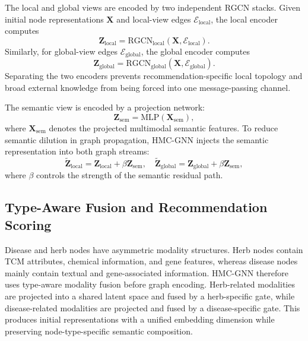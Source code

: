 \documentclass[journal,twoside,web]{ieeecolor}
\begin{document}
The local and global views are encoded by two independent RGCN stacks. Given initial node representations $\mathbf{X}$ and local-view edges $\mathcal{E}_{\mathrm{local}}$, the local encoder computes
\begin{equation}
\mathbf{Z}_{\mathrm{local}}
=\mathrm{RGCN}_{\mathrm{local}}(\mathbf{X},\mathcal{E}_{\mathrm{local}}).
\label{eq:local_rgcn}
\end{equation}
Similarly, for global-view edges $\mathcal{E}_{\mathrm{global}}$, the global encoder computes
\begin{equation}
\mathbf{Z}_{\mathrm{global}}
=\mathrm{RGCN}_{\mathrm{global}}(\mathbf{X},\mathcal{E}_{\mathrm{global}}).
\label{eq:global_rgcn}
\end{equation}
Separating the two encoders prevents recommendation-specific local topology and broad external knowledge from being forced into one message-passing channel.

The semantic view is encoded by a projection network:
\begin{equation}
\mathbf{Z}_{\mathrm{sem}}=\mathrm{MLP}(\mathbf{X}_{\mathrm{sem}}),
\label{eq:semantic_projection}
\end{equation}
where $\mathbf{X}_{\mathrm{sem}}$ denotes the projected multimodal semantic features. To reduce semantic dilution in graph propagation, HMC-GNN injects the semantic representation into both graph streams:
\begin{equation}
\widetilde{\mathbf{Z}}_{\mathrm{local}}
=\mathbf{Z}_{\mathrm{local}}+\beta\mathbf{Z}_{\mathrm{sem}},
\quad
\widetilde{\mathbf{Z}}_{\mathrm{global}}
=\mathbf{Z}_{\mathrm{global}}+\beta\mathbf{Z}_{\mathrm{sem}},
\label{eq:semantic_residual}
\end{equation}
where $\beta$ controls the strength of the semantic residual path.

\subsection{Type-Aware Fusion and Recommendation Scoring}
\label{subsec:fusion_scoring}

Disease and herb nodes have asymmetric modality structures. Herb nodes contain TCM attributes, chemical information, and gene features, whereas disease nodes mainly contain textual and gene-associated information. HMC-GNN therefore uses type-aware modality fusion before graph encoding. Herb-related modalities are projected into a shared latent space and fused by a herb-specific gate, while disease-related modalities are projected and fused by a disease-specific gate. This produces initial representations with a unified embedding dimension while preserving node-type-specific semantic composition.
\end{document}
